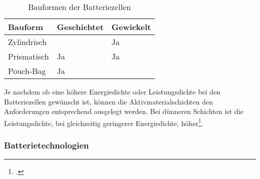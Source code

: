 \begin{table}[H]
	\caption{Bauformen der Batteriezellen}
	\label{tab:BauformenZelle}
	\vspace{0.2cm}	
	\begin{tabularx}{\textwidth}{ |X|X|X|  }
		\toprule[1.5pt]
		\textbf{Bauform} & \textbf{Geschichtet} & \textbf{Gewickelt} \\
		\hline\hline
		Zylindrisch &  & Ja\\
		\hline
		Prismatisch & Ja & Ja \\
		\hline
		Pouch-Bag & Ja &  \\
		\bottomrule[1.5pt]
	\end{tabularx}		
\end{table}

Je nachdem ob eine höhere Energiedichte oder Leistungsdichte bei den Batteriezellen gewünscht ist, können die Aktivmaterialschichten den Anforderungen entsprechend ausgelegt werden. Bei dünneren Schichten ist die Leistungsdichte, bei gleichzeitig geringerer Energiedichte, höher\footcite[Vlg.\label{Ecker2013}][S.66-67]{Ecker2013}.\\

\subsubsection*{Batterietechnologien}\label{subsub:BatTechnology}

